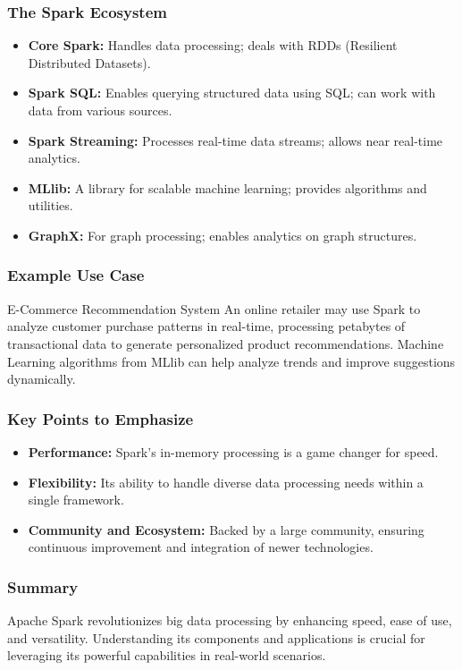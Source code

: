 \documentclass[aspectratio=169]{beamer}
\begin{document}
\begin{frame}[fragile]
    \frametitle{The Spark Ecosystem}
    \begin{itemize}
        \item \textbf{Core Spark:} Handles data processing; deals with RDDs (Resilient Distributed Datasets).
        \item \textbf{Spark SQL:} Enables querying structured data using SQL; can work with data from various sources.
        \item \textbf{Spark Streaming:} Processes real-time data streams; allows near real-time analytics.
        \item \textbf{MLlib:} A library for scalable machine learning; provides algorithms and utilities.
        \item \textbf{GraphX:} For graph processing; enables analytics on graph structures.
    \end{itemize}
\end{frame}

\begin{frame}[fragile]
    \frametitle{Example Use Case}
    \begin{block}{E-Commerce Recommendation System}
        An online retailer may use Spark to analyze customer purchase patterns in real-time, processing petabytes of transactional data to generate personalized product recommendations.
        Machine Learning algorithms from MLlib can help analyze trends and improve suggestions dynamically.
    \end{block}
\end{frame}

\begin{frame}[fragile]
    \frametitle{Key Points to Emphasize}
    \begin{itemize}
        \item \textbf{Performance:} Spark's in-memory processing is a game changer for speed.
        \item \textbf{Flexibility:} Its ability to handle diverse data processing needs within a single framework.
        \item \textbf{Community and Ecosystem:} Backed by a large community, ensuring continuous improvement and integration of newer technologies.
    \end{itemize}
\end{frame}

\begin{frame}[fragile]
    \frametitle{Summary}
    Apache Spark revolutionizes big data processing by enhancing speed, ease of use, and versatility. 
    Understanding its components and applications is crucial for leveraging its powerful capabilities in real-world scenarios.
\end{frame}
\end{document}
